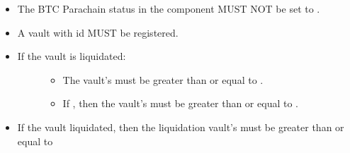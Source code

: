 \documentclass[a4paper,10pt,english]{sphinxmanual}
\begin{document}
\begin{itemize}
\item {} 
The BTC Parachain status in the {\hyperref[\detokenize{spec/security:security}]{}} component MUST NOT be set to .

\item {} 
A vault with id  MUST be registered.

\item {} \begin{description}
\item[{If the vault is  liquidated:}] \leavevmode\begin{itemize}
\item {} 
The vault’s  must be greater than or equal to .

\item {} 
If , then the vault’s  must be greater than or equal to .

\end{itemize}

\end{description}

\item {} 
If the vault  liquidated, then the liquidation vault’s  must be greater than or equal to 

\end{itemize}
\end{document}
